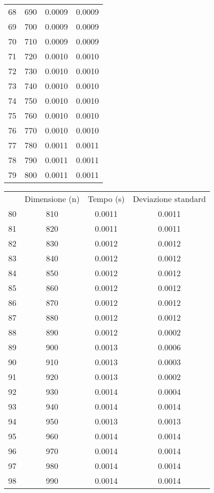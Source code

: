 \begin{table}
\begin{adjustbox}{width=1\textwidth/2}
\begin{tabular}{|c|c|c|c|}
68 & 690 & 0.0009 & 0.0009 \\
\cline{1-4}
69 & 700 & 0.0009 & 0.0009 \\
\cline{1-4}
70 & 710 & 0.0009 & 0.0009 \\
\cline{1-4}
71 & 720 & 0.0010 & 0.0010 \\
\cline{1-4}
72 & 730 & 0.0010 & 0.0010 \\
\cline{1-4}
73 & 740 & 0.0010 & 0.0010 \\
\cline{1-4}
74 & 750 & 0.0010 & 0.0010 \\
\cline{1-4}
75 & 760 & 0.0010 & 0.0010 \\
\cline{1-4}
76 & 770 & 0.0010 & 0.0010 \\
\cline{1-4}
77 & 780 & 0.0011 & 0.0011 \\
\cline{1-4}
78 & 790 & 0.0011 & 0.0011 \\
\cline{1-4}
79 & 800 & 0.0011 & 0.0011 \\
\cline{1-4}
\end{tabular}
\end{adjustbox}
\end{table}

\begin{table}
\centering
\begin{adjustbox}{width=1\textwidth/2}
\begin{tabular}{|c|c|c|c|}
\hline
 & Dimensione (n) & Tempo (s) & Deviazione standard \\
80 & 810 & 0.0011 & 0.0011 \\
\cline{1-4}
81 & 820 & 0.0011 & 0.0011 \\
\cline{1-4}
82 & 830 & 0.0012 & 0.0012 \\
\cline{1-4}
83 & 840 & 0.0012 & 0.0012 \\
\cline{1-4}
84 & 850 & 0.0012 & 0.0012 \\
\cline{1-4}
85 & 860 & 0.0012 & 0.0012 \\
\cline{1-4}
86 & 870 & 0.0012 & 0.0012 \\
\cline{1-4}
87 & 880 & 0.0012 & 0.0012 \\
\cline{1-4}
88 & 890 & 0.0012 & 0.0002 \\
\cline{1-4}
89 & 900 & 0.0013 & 0.0006 \\
\cline{1-4}
90 & 910 & 0.0013 & 0.0003 \\
\cline{1-4}
91 & 920 & 0.0013 & 0.0002 \\
\cline{1-4}
92 & 930 & 0.0014 & 0.0004 \\
\cline{1-4}
93 & 940 & 0.0014 & 0.0014 \\
\cline{1-4}
94 & 950 & 0.0013 & 0.0013 \\
\cline{1-4}
95 & 960 & 0.0014 & 0.0014 \\
\cline{1-4}
96 & 970 & 0.0014 & 0.0014 \\
\cline{1-4}
97 & 980 & 0.0014 & 0.0014 \\
\cline{1-4}
98 & 990 & 0.0014 & 0.0014 \\
\cline{1-4}
\end{tabular}
\end{adjustbox}
\end{table}


